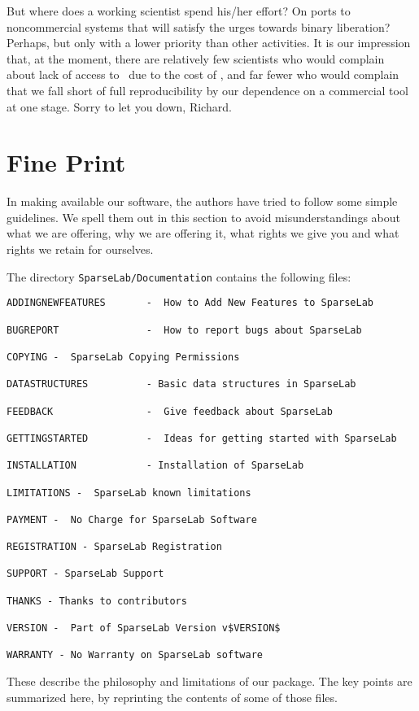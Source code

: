 \documentclass{article}
\begin{document}
But where does a working scientist spend his/her effort? On ports to noncommercial systems that
will satisfy the urges towards binary liberation? Perhaps, but only with a lower priority than
other activities. It is our impression that, at the moment, there are relatively few scientists who
would complain about lack of access to \WaveLab\ due to the cost of \Matlab, and far fewer who
would complain that we fall short of full reproducibility by our dependence on a commercial tool at
one stage. Sorry to let you down, Richard.

\pagebreak

\section{Fine Print}

In making available our software, the authors have tried to follow some simple
guidelines.  We spell them out in this section  to avoid misunderstandings about
what we are offering, why we are offering it, what rights we give you and what
rights we retain for ourselves.

The directory {\tt SparseLab/Documentation} contains the following
files:
\begin{verbatim}
ADDINGNEWFEATURES       -  How to Add New Features to SparseLab

BUGREPORT               -  How to report bugs about SparseLab

COPYING -  SparseLab Copying Permissions

DATASTRUCTURES          - Basic data structures in SparseLab

FEEDBACK                -  Give feedback about SparseLab

GETTINGSTARTED          -  Ideas for getting started with SparseLab

INSTALLATION            - Installation of SparseLab

LIMITATIONS -  SparseLab known limitations

PAYMENT -  No Charge for SparseLab Software

REGISTRATION - SparseLab Registration

SUPPORT - SparseLab Support

THANKS - Thanks to contributors

VERSION -  Part of SparseLab Version v$VERSION$

WARRANTY - No Warranty on SparseLab software
\end{verbatim}
These describe the philosophy and limitations of our package.  The key points
are summarized here, by reprinting the contents of some of those files.
\end{document}
